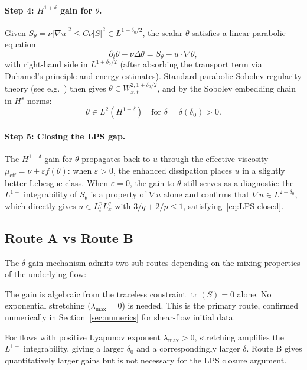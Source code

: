 \documentclass[11pt]{article}
\theoremstyle{definition}
\newcommand{\abs}[1]{\left|#1\right|}
\newcommand{\grad}{\nabla}
\newcommand{\eps}{\varepsilon}
\newcommand{\thetafield}{\theta}
\newcommand{\mueff}{\mu_{\mathrm{eff}}}
\begin{document}
\paragraph{Step 4: $H^{1+\delta}$ gain for $\theta$.}
Given $S_\theta = \nu \abs{\grad u}^2 \leq C \nu \abs{S}^2 \in L^{1+\delta_0/2}$,
the scalar $\theta$ satisfies a linear parabolic equation
\begin{equation}
  \partial_t \thetafield - \nu \Delta \thetafield = S_\theta - u \cdot \grad \thetafield,
  \label{eq:theta-parabolic}
\end{equation}
with right-hand side in $L^{1+\delta_0/2}$ (after absorbing the transport term
via Duhamel's principle and energy estimates). Standard parabolic Sobolev regularity
theory (see e.g.~\cite{Lady1968}) then gives $\thetafield \in W^{2,1+\delta_0/2}_{x,t}$,
and by the Sobolev embedding chain in $H^s$ norms:
\begin{equation}
  \thetafield \in L^2(H^{1+\delta}) \quad \text{for } \delta = \delta(\delta_0) > 0.
  \label{eq:theta-gain}
\end{equation}

\paragraph{Step 5: Closing the LPS gap.}
The $H^{1+\delta}$ gain for $\thetafield$ propagates back to $u$ through the
effective viscosity $\mueff = \nu + \eps f(\thetafield)$: when $\eps > 0$,
the enhanced dissipation places $u$ in a slightly better Lebesgue class.
When $\eps = 0$, the gain to $\thetafield$ still serves as a diagnostic:
the $L^{1+}$ integrability of $S_\theta$ is a property of $\grad u$ alone
and confirms that $\grad u \in L^{2+\delta_0}$, which directly gives
$u \in L^p_t L^q_x$ with $3/q + 2/p \leq 1$, satisfying~\eqref{eq:LPS-closed}.

\subsection{Route A vs Route B}

The $\delta$-gain mechanism admits two sub-routes depending on the mixing properties
of the underlying flow:

\begin{description}[style=nextline]
  \item[Route A (CZ, no mixing required)]
    The gain is algebraic from the traceless constraint $\operatorname{tr}(S) = 0$ alone.
    No exponential stretching ($\lambda_{\max} = 0$) is needed. This is the primary
    route, confirmed numerically in Section~\ref{sec:numerics} for shear-flow initial data.
  \item[Route B (CZ + mixing enhancement)]
    For flows with positive Lyapunov exponent $\lambda_{\max} > 0$, stretching
    amplifies the $L^{1+}$ integrability, giving a larger $\delta_0$ and a
    correspondingly larger $\delta$. Route B gives quantitatively larger gains
    but is not necessary for the LPS closure argument.
\end{description}
\end{document}
